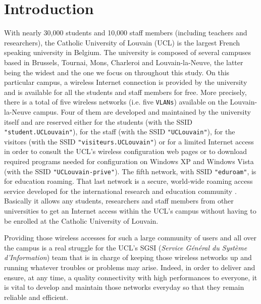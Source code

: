 
\chapter{Introduction} %

\label{Chapter1} %


With nearly 30,000 students and 10,000 staff members (including teachers and researchers), the Catholic University of Louvain (UCL) is the largest French speaking university in Belgium. The university is composed of several campuses based in Brussels, Tournai, Mons, Charleroi and Louvain-la-Neuve, the latter being the widest and the one we focus on throughout this study. On this particular campus, a wireless Internet connection is provided by the university and is available for all the students and staff members for free. More precisely, there is a total of five wireless networks (i.e. five \texttt{VLANs}) available on the Louvain-la-Neuve campus. Four of them are developed and maintained by the university itself and are reserved either for the students (with the SSID \texttt{"student.UCLouvain"}), for the staff (with the SSID \texttt{"UCLouvain"}), for the visitors (with the SSID \texttt{"visiteurs.UCLouvain"}) or for a limited Internet access in order to consult the UCL's wireless configuration web pages or to download required programs needed for configuration on Windows XP and Windows Vista (with the SSID \texttt{"UCLouvain-prive"}). The fifth network, with SSID \texttt{"eduroam"}, is for education roaming. That last network is a secure, world-wide roaming access service developed for the international research and education community \cite{eduroam1}. Basically it allows any students, researchers and staff members from other universities to get an Internet access within the UCL's campus without having to be enrolled at the Catholic University of Louvain.

Providing those wireless accesses for such a large community of users and all over the campus is a real struggle for the UCL's SGSI (\textit{Service Général du Système d'Information}) team that is in charge of keeping those wireless networks up and running whatever troubles or problems may arise. Indeed, in order to deliver and ensure, at any time, a quality connectivity with high performances to everyone, it is vital to develop and maintain those networks everyday so that they remain reliable and efficient.
 
